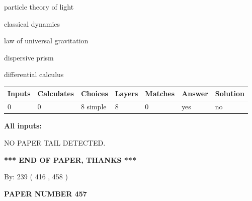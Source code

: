 \documentclass[12pt]{article}
\begin{document}
 
\noindent{}
 
 
particle theory of light
 
 
classical dynamics
 
 
law of universal gravitation
 
 
dispersive prism
 
 
differential calculus
 
 
\noindent{}
 
 
   
   
   
   
\noindent\begin{tabular}{|l|l|l|l|l|l|l|}
 \hline
Inputs & Calculates & Choices & Layers & Matches & Answer & Solution \\ \hline
 0  & 
 0  & 
 8
  simple  
  & 
 8  & 
 0  & 
  yes & 
  no 
  \\ \hline
 \end{tabular}
   
   
   
   
\noindent{}
   
   
   
   
\noindent\vspace{0.1in}\hspace{-0.08in} {\textbf{\Large{All inputs: }}}
   
   
   
   
\vspace{2.0in} NO PAPER TAIL DETECTED.
   
   
   
   
\vspace{1.0in} 
{\textbf{\large{ *** END OF PAPER, THANKS *** }}} 
   
   
\hspace{1.0in} By: 
 239 ( 416 ,  458 )
   
   
   
   
\newpage 
\setcounter{page}{ 
   457001 } 
   
   
   
   
 {\textbf{ \Large{ PAPER NUMBER  457  }}}
   
\end{document}
